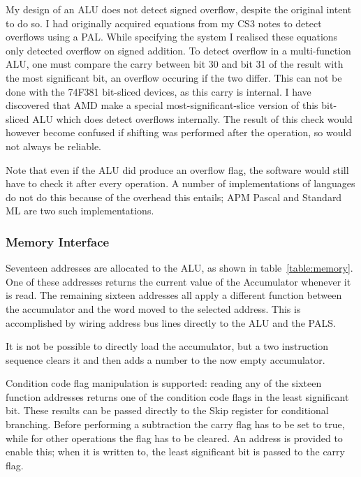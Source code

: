 My design of an ALU does not detect signed overflow, despite the original intent to do so.
I had originally
acquired equations  from my CS3 notes to detect  overflows using a PAL.
While specifying the system  I realised
these equations  only detected overflow on signed addition. 
To detect overflow in a multi-function ALU, one must compare the carry between
bit 30 and bit 31 of the result with the most significant bit, an overflow occuring if the two differ.
This can not be done with the 74F381 bit-sliced devices, as this carry is internal.
I have discovered that AMD make a special most-significant-slice version of this bit-sliced ALU which does detect overflows internally. 
The result of this check would however become confused if shifting was performed after the operation, so would not always be reliable.

 Note that even if the ALU did produce an overflow flag, the software would still have to check it after every operation. A number of
implementations of languages do not do this because of the overhead this entails; 
APM Pascal and Standard ML are two such  implementations.

\subsubsection{Memory Interface}

Seventeen addresses are allocated to the ALU, as shown in table~\ref{table:memory}.
One of these addresses returns the current value of the Accumulator whenever it is read.
The remaining sixteen addresses all apply a different function between the accumulator and the word moved to the selected address.
This is accomplished by wiring  address bus lines directly to the ALU  and the PALS.

It is not be possible to directly load the 
accumulator, but a two instruction sequence  clears it and then adds a 
number to the now empty accumulator.

Condition code flag manipulation is  supported:
reading any of the sixteen function addresses returns one of the condition code flags in the least significant bit. 
These results can be passed directly to the Skip register for conditional branching.
Before performing a subtraction the carry flag has to be set to true, while
for other operations the flag has to be cleared.
An address is provided to enable this; when it is written to, the least significant bit is passed to the carry flag.
